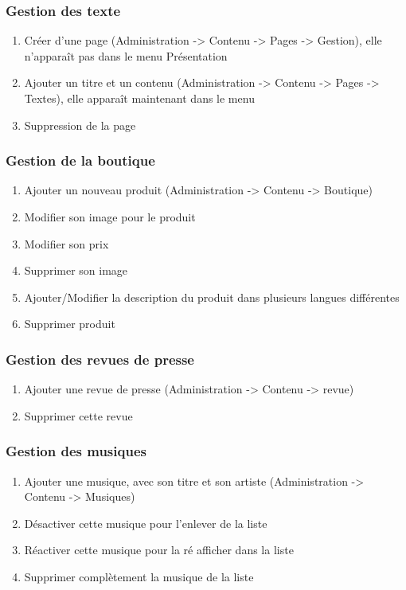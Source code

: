 \documentclass[11pt]{report}
\begin{document}
\subsubsection*{Gestion des texte}
\begin{enumerate}
\item Créer d’une page (Administration -> Contenu -> Pages -> Gestion), elle 
n’apparaît pas dans le menu \og Présentation \fg{}
\item Ajouter un titre et un contenu (Administration -> Contenu -> Pages -> 
Textes), elle apparaît maintenant dans le menu
\item Suppression de la page
\end{enumerate}
\subsubsection*{Gestion de la boutique}
\begin{enumerate}
\item Ajouter un nouveau produit (Administration -> Contenu -> Boutique)
\item Modifier son image pour le produit
\item Modifier son prix
\item Supprimer son image
\item Ajouter/Modifier la description du produit dans plusieurs langues 
différentes
\item Supprimer produit
\end{enumerate}
\subsubsection*{Gestion des revues de presse}
\begin{enumerate}
\item Ajouter une revue de presse (Administration -> Contenu -> revue)
\item Supprimer cette revue
\end{enumerate}
\subsubsection*{Gestion des musiques}
\begin{enumerate}
\item Ajouter une musique, avec son titre et son artiste (Administration -> 
Contenu -> Musiques)
\item Désactiver cette musique pour l’enlever de la liste
\item Réactiver cette musique pour la ré afficher dans la liste
\item Supprimer complètement la musique de la liste
\end{enumerate}
\end{document}
